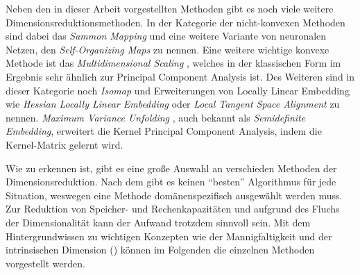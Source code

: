 Neben den in dieser Arbeit vorgestellten Methoden gibt es noch viele weitere
Dimensionsreduktionsmethoden. In der Kategorie der nicht-konvexen Methoden sind dabei das
\textit{Sammon Mapping} \parencite{Sammon.1969} und eine weitere Variante von neuronalen Netzen, den \textit{Self-Organizing
	Maps} \parencite{Kohonen.1990} zu nennen. Eine weitere wichtige konvexe Methode ist das
\textit{Multidimensional Scaling} \parencites{Kruskal.1964}{Cox.2008}, welches in der klassischen Form im Ergebnis sehr ähnlich zur
Principal Component Analysis ist. Des Weiteren sind in dieser Kategorie noch \textit{Isomap} \parencite{Tenenbaum.2000} und Erweiterungen von Locally Linear Embedding wie \textit{Hessian Locally
	Linear Embedding} \parencite{Donoho.2003} oder \textit{Local Tangent Space Alignment} \parencite{Zhang.2002} zu nennen. \textit{Maximum Variance Unfolding} \parencite{Weinberger.2006}, auch bekannt als \textit{Semidefinite Embedding}, erweitert die Kernel
Principal Component Analysis, indem die Kernel-Matrix gelernt wird.

Wie zu erkennen ist, gibt es eine große Auswahl an verschieden Methoden der Dimensionsreduktion.
Nach dem  \parencite{Wolpert.1997} gibt es keinen \enquote{besten} Algorithmus für jede Situation, weswegen eine
Methode domänenspezifisch ausgewählt werden muss. Zur Reduktion von Speicher- und Rechenkapazitäten
und aufgrund des Fluchs der Dimensionalität kann der Aufwand trotzdem sinnvoll sein. Mit dem
Hintergrundwissen zu wichtigen Konzepten wie der Mannigfaltigkeit und der intrinsischen Dimension
() können im Folgenden die einzelnen
Methoden vorgestellt werden.